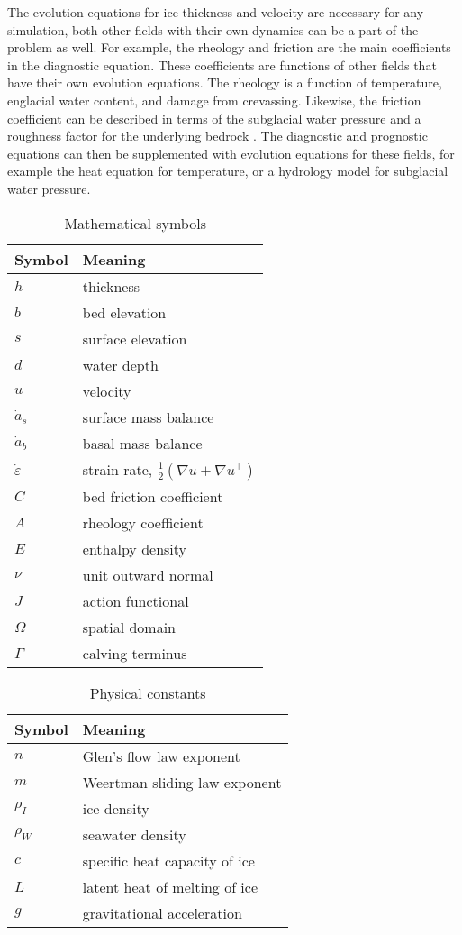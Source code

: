 \documentclass[journal abbreviation, manuscript]{copernicus}
\begin{document}
The evolution equations for ice thickness and velocity are necessary for any simulation, both other fields with their own dynamics can be a part of the problem as well.
For example, the rheology and friction are the main coefficients in the diagnostic equation.
These coefficients are functions of other fields that have their own evolution equations.
The rheology is a function of temperature, englacial water content, and damage from crevassing.
Likewise, the friction coefficient can be described in terms of the subglacial water pressure and a roughness factor for the underlying bedrock \citep{cuffey2010physics}.
The diagnostic and prognostic equations can then be supplemented with evolution equations for these fields, for example the heat equation for temperature, or a hydrology model for subglacial water pressure.

\begin{table}[h]
    \begin{tabular}{l|l}
        Symbol & Meaning \\
        \hline
        $h$ & thickness \\
        $b$ & bed elevation  \\
        $s$ & surface elevation  \\
        $d$ & water depth \\
        $u$ & velocity \\
        $\dot a_s$ & surface mass balance \\
        $\dot a_b$ & basal mass balance \\
        $\dot\varepsilon$ & strain rate, $\frac{1}{2}(\nabla u + \nabla u^\top)$\\
        $C$ & bed friction coefficient \\
        $A$ & rheology coefficient \\
        $E$ & enthalpy density \\
        $\nu$ & unit outward normal \\
        $J$ & action functional \\
        $\Omega$ & spatial domain \\
        $\Gamma$ & calving terminus
    \end{tabular}
    \caption{Mathematical symbols}
    \label{tab:mathematical-symbols}
\end{table}

\begin{table}[h]
    \begin{tabular}{l|l}
        Symbol & Meaning \\
        \hline
        $n$ & Glen's flow law exponent \\
        $m$ & Weertman sliding law exponent \\
        $\rho_I$ & ice density \\
        $\rho_W$ & seawater density \\
        $c$ & specific heat capacity of ice \\
        $L$ & latent heat of melting of ice \\
        $g$ & gravitational acceleration
    \end{tabular}
    \caption{Physical constants}
    \label{tab:physical-constants}
\end{table}
\end{document}
